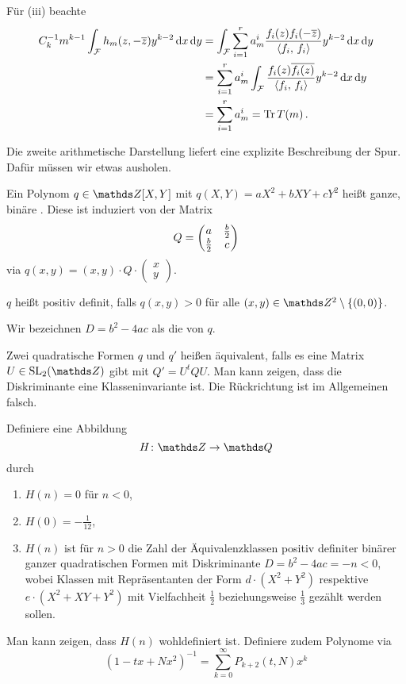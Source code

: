 \begin{bewe}
	Für (iii) beachte
	\[\begin{split}
	C_k^{-1} m^{k-1} \int_\F h_m(z, -\conj{z}) y^{k-2}\opd x \opd y
	&= \int_\F \sum_{i=1}^r a_m^i \frac{f_i(z)f_i(-\conj z)}{\scalarprd{f_i}{f_i}} y^{k-2} \opd x \opd y \\
	&= \sum_{i=1}^r a_m^i\int_\F \frac{f_i(z) \conj{f_i(z)}}{\scalarprd{f_i}{f_i}} y ^{k-2} \opd x \opd y \\
	&= \sum_{i=1}^r a_m^i = \Tr T(m)
	\,.
	\end{split}
	\]
\end{bewe}

Die zweite arithmetische Darstellung liefert eine explizite Beschreibung der Spur.
Dafür müssen wir etwas ausholen.

\begin{defi}
	Ein Polynom $q \in \ZZ[X, Y]$ mit $q(X,Y) = aX^2 + bXY + cY^2$ heißt ganze, binäre .
	Diese ist induziert von der Matrix
	\[
	Q = \mymat*{a}{\frac{b}{2}}{\frac{b}{2}}{c}
	\]
	via $q(x,y) = (x, y) \cdot Q \cdot (\begin{smallmatrix} x \\ y \end{smallmatrix})$.
	
	$q$ heißt positiv definit, falls $q(x,y) > 0$ für alle $(x,y) \in \ZZ^2\setminus\{(0,0)\}$.
	
	Wir bezeichnen $D = b^2 - 4ac$ als die  von $q$.
	
	Zwei quadratische Formen $q$ und $q'$ heißen äquivalent, falls es eine Matrix $U \in \SL_2(\ZZ)$ gibt mit $Q' = U^t Q U$. Man kann zeigen, dass die Diskriminante eine Klasseninvariante ist.
	Die Rückrichtung ist im Allgemeinen falsch.
	
	Definiere eine Abbildung
	\[
	H\colon \ZZ \ra \QQ
	\]
	durch
	\begin{enumerate}
		\item $H(n) = 0$ für $n < 0$,
		\item $H(0) = - \frac{1}{12}$,
		\item $H(n)$ ist für $n > 0$ die Zahl der Äquivalenzklassen positiv definiter binärer ganzer quadratischen Formen mit Diskriminante $D = b^2-4ac = -n < 0$, wobei Klassen mit Repräsentanten der Form $d\cdot (X^2 + Y^2)$ respektive $e \cdot (X^2 + XY + Y^2)$ mit Vielfachheit $\frac{1}{2}$ beziehungsweise $\frac{1}{3}$ gezählt werden sollen.
	\end{enumerate}
	Man kann zeigen, dass $H(n)$ wohldefiniert ist.
	Definiere zudem Polynome via
	\[
	(1-tx+Nx^2)^{-1} = \sum_{k=0}^\infty P_{k+2}(t,N) x^k
	\]
\end{defi}


